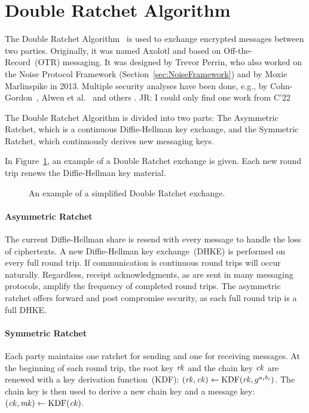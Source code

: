 \section{Double Ratchet Algorithm}

The Double Ratchet Algorithm~\cite{DoubleRatchetAlg} is used to exchange encrypted messages between two parties.
Originally, it was named Axolotl and based on Off-the-Record~(OTR) messaging.
It was designed by Trevor Perrin, who also worked on the Noise Protocol Framework (Section~\ref{sec:NoiseFramework}) and by Moxie Marlinspike in 2013.
Multiple security analyses have been done, e.g., by Cohn-Gordon~\cite{EUROSP:CCDGS17}, Alwen et al.~\cite{EC:AlwCorDod19} and others \cite{C:BFGMR22}. \alert{JR: I could only find one work from C'22}

The Double Ratchet Algorithm is divided into two parts:
The Asymmetric Ratchet, which is a continuous Diffie-Hellman key exchange, and the Symmetric Ratchet, which continuously derives new messaging keys.

In Figure~\ref{fig:double-ratchet:double_ratchet}, an example of a Double Ratchet exchange is given.
Each new round trip renews the Diffie-Hellman key material.

\begin{figure}[!ht]
    \centering
    
    \caption{An example of a simplified Double Ratchet exchange.}
    \label{fig:double-ratchet:double_ratchet}
\end{figure}

\paragraph{Asymmetric Ratchet}
The current Diffie-Hellman share is resend with every message to handle the loss of ciphertexts.
A new Diffie-Hellman key exchange~(DHKE) is performed on every full round trip.
If communication is continuous round trips will occur naturally.
Regardless, receipt acknowledgments, as are sent in many messaging protocols, amplify the frequency of completed round trips.
The asymmetric ratchet offers forward and post compromise security, as each full round trip is a full DHKE.

\paragraph{Symmetric Ratchet}
Each party maintains one ratchet for sending and one for receiving messages.
At the beginning of each round trip, the root key $\mathit{rk}$ and the chain key $\mathit{ck}$ are renewed with a key derivation function~(KDF): $(\mathit{rk}, \mathit{ck})\gets\mathrm{KDF}(\mathit{rk}, g^{a_i b_i})$.
The chain key is then used to derive a new chain key and a message key: $(\mathit{ck}, \mathit{mk})\gets\mathrm{KDF}(\mathit{ck})$.

